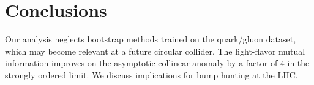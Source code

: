 \section{Conclusions}\label{sec:conclusions}

Our analysis neglects bootstrap methods trained on the quark/gluon
dataset, which may become relevant at a future circular collider. The
light-flavor mutual information improves on the asymptotic collinear
anomaly by a factor of 4 in the strongly ordered limit. We discuss
implications for bump hunting at the LHC.

